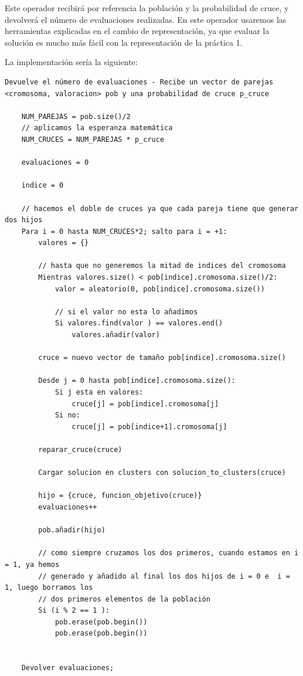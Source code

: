 \documentclass[12pt, spanish]{article}
\begin{document}
Este operador recibirá por referencia la población y la probabilidad de cruce, y devolverá el número de evaluaciones realizadas. En este operador usaremos las herramientas explicadas en el cambio de representación, ya que evaluar la solución es mucho más fácil con la representación de la práctica 1.
 
La implementación sería la siguiente:

\begin{lstlisting}
Devuelve el número de evaluaciones - Recibe un vector de parejas <cromosoma, valoracion> pob y una probabilidad de cruce p_cruce

	NUM_PAREJAS = pob.size()/2
	// aplicamos la esperanza matemática
	NUM_CRUCES = NUM_PAREJAS * p_cruce
	
	evaluaciones = 0
	
	indice = 0
	
	// hacemos el doble de cruces ya que cada pareja tiene que generar dos hijos
	Para i = 0 hasta NUM_CRUCES*2; salto para i = +1:
		valores = {}

		// hasta que no generemos la mitad de indices del cromosoma		
		Mientras valores.size() < pob[indice].cromosoma.size()/2:
			valor = aleatorio(0, pob[indice].cromosoma.size())
			
			// si el valor no esta lo añadimos
			Si valores.find(valor ) == valores.end() 
				valores.añadir(valor)
				
		cruce = nuevo vector de tamaño pob[indice].cromosoma.size()
		
		Desde j = 0 hasta pob[indice].cromosoma.size():
			Si j esta en valores:
				cruce[j] = pob[indice].cromosoma[j]
			Si no:
				cruce[j] = pob[indice+1].cromosoma[j]
				
		reparar_cruce(cruce)
		
		Cargar solucion en clusters con solucion_to_clusters(cruce)
		
		hijo = {cruce, funcion_objetivo(cruce)}
		evaluaciones++
		
		pob.añadir(hijo)
		
		// como siempre cruzamos los dos primeros, cuando estamos en i = 1, ya hemos
		// generado y añadido al final los dos hijos de i = 0 e  i = 1, luego borramos los
		// dos primeros elementos de la población
		Si (i % 2 == 1 ):
			pob.erase(pob.begin())
			pob.erase(pob.begin())
					

	Devolver evaluaciones;

\end{lstlisting}
\end{document}
